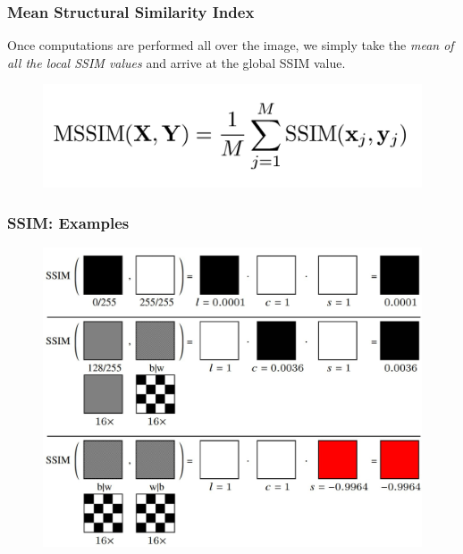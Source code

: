 \documentclass[13.5pt,aspecratio=169, xcolor=dvipsnames]{beamer}
\begin{document}
\begin{frame}
    \onehalfspacing
        \frametitle{Mean Structural Similarity Index}
        
        Once computations are performed all over the image, we simply take the \textit{mean of all the local SSIM values} and arrive at the global SSIM value.

        \begin{figure}[h]
            \centering
            \includegraphics[width=0.7\linewidth]{MSSIM_formula.png}
        \end{figure}
       
\end{frame}
    


\begin{frame}
    \onehalfspacing
        \frametitle{SSIM: Examples}
        
        \begin{figure}
            \centering
            \includegraphics[width=0.8\linewidth]{SSIM_Example_1.jpg}
        \end{figure}
        
       
\end{frame}
    
\end{document}
